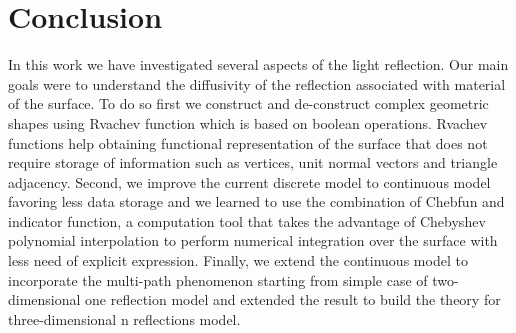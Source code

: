 \documentclass[11pt]{amsart}
\theoremstyle{definition}
\begin{document}
\section{Conclusion}

In this work we have investigated several aspects of the light reflection. Our main goals were to understand the diffusivity of the reflection associated with material of the surface. To do so first we construct and de-construct complex geometric shapes using Rvachev function which is based on boolean operations. Rvachev functions help obtaining functional representation of the surface that does not require storage of information such as vertices, unit normal vectors and triangle adjacency.
Second, we improve the current discrete model to continuous model favoring less data storage and we learned to use the combination of Chebfun and indicator function, a computation tool that takes the advantage of Chebyshev polynomial interpolation to perform numerical integration over the surface with less need of explicit expression.
Finally, we extend the continuous model to incorporate the multi-path phenomenon starting from simple case of two-dimensional one reflection model and extended the result to build the theory for three-dimensional n reflections model.
\end{document}
